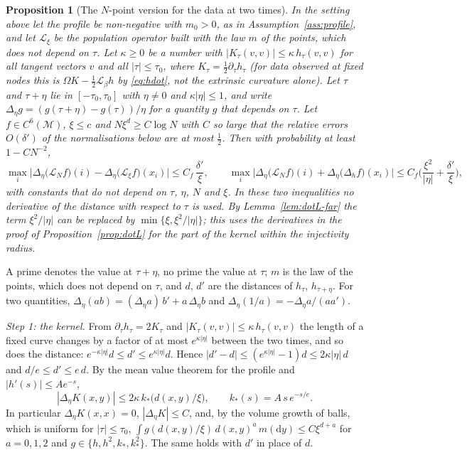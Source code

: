 \documentclass[11pt,a4paper]{article}
\makeatletter
\theoremstyle{stmt}
\newtheorem{proposition}[theorem]{Proposition}
\theoremstyle{defn}
\theoremstyle{rmk}
\renewenvironment{proof}[1][\proofname]{\par\pushQED{\qed}\normalfont\topsep6\p@\@plus6\p@\relax
  \trivlist\item[\hskip\labelsep{\sffamily\itshape\small #1.}]\ignorespaces}{\popQED\endtrivlist\@endpefalse}
\numberwithin{equation}{section}
\newcommand{\Lie}{\mathcal{L}}
\newcommand{\M}{\mathcal{M}}
\newcommand{\Lc}{\mathcal{L}}
\newcommand{\dd}{\mathrm{d}}
\makeatother
\begin{document}
{\begin{proposition}[The $N$-point version for the data at two times]\label{prop:dotLN-diff}
In the setting above let the profile be non-negative with $m_0>0$, as in Assumption~\ref{ass:profile}, and let $\mathcal L_\xi$ be the population operator built with the law $m$ of the points, which does not depend on $\tau$. Let $\kappa\ge0$ be a number with $|K_\tau(v,v)|\le\kappa\,h_\tau(v,v)$ for all tangent vectors $v$ and all $|\tau|\le\tau_0$, where $K_\tau=\frac12\partial_\tau h_\tau$ (for data observed at fixed nodes this is $\Omega K-\frac12\Lie_\beta h$ by \eqref{eq:hdot}, not the extrinsic curvature alone). Let $\tau$ and $\tau+\eta$ lie in $[-\tau_0,\tau_0]$ with $\eta\ne0$ and $\kappa|\eta|\le1$, and write $\Delta_\eta g=(g(\tau+\eta)-g(\tau))/\eta$ for a quantity $g$ that depends on $\tau$. Let $f\in C^6(\M)$, $\xi\le c$ and $N\xi^d\ge C\log N$ with $C$ so large that the relative errors $O(\delta')$ of the normalisations below are at most $\frac12$. Then with probability at least $1-CN^{-2}$,
\[
\max_i\Big|\Delta_\eta\big(\Lc_Nf\big)(i)-\Delta_\eta\big(\Lc_\xi f\big)(x_i)\Big|\le C_f\,\frac{\delta'}{\xi},\qquad
\max_i\Big|\Delta_\eta\big(\Lc_Nf\big)(i)+\Delta_\eta\big(\Delta_hf\big)(x_i)\Big|\le C_f\Big(\frac{\xi^2}{|\eta|}+\frac{\delta'}{\xi}\Big),
\]
with constants that do not depend on $\tau$, $\eta$, $N$ and $\xi$. In these two inequalities no derivative of the distance with respect to $\tau$ is used. By Lemma~\ref{lem:dotL-far} the term $\xi^2/|\eta|$ can be replaced by $\min\{\xi,\xi^2/|\eta|\}$; this uses the derivatives in the proof of Proposition~\ref{prop:dotL} for the part of the kernel within the injectivity radius.
\end{proposition}

\begin{proof}
A prime denotes the value at $\tau+\eta$, no prime the value at $\tau$; $m$ is the law of the points, which does not depend on $\tau$, and $d$, $d'$ are the distances of $h_\tau$, $h_{\tau+\eta}$. For two quantities, $\Delta_\eta(ab)=(\Delta_\eta a)\,b'+a\,\Delta_\eta b$ and $\Delta_\eta(1/a)=-\Delta_\eta a/(aa')$.

\emph{Step 1: the kernel.} From $\partial_\tau h_\tau=2K_\tau$ and $|K_\tau(v,v)|\le\kappa\,h_\tau(v,v)$ the length of a fixed curve changes by a factor of at most $e^{\kappa|\eta|}$ between the two times, and so does the distance: $e^{-\kappa|\eta|}d\le d'\le e^{\kappa|\eta|}d$. Hence $|d'-d|\le(e^{\kappa|\eta|}-1)d\le2\kappa|\eta|\,d$ and $d/e\le d'\le e\,d$. By the mean value theorem for the profile and $|h'(s)|\le Ae^{-s}$,
\[
|\Delta_\eta K(x,y)|\le2\kappa\,k_*\big(d(x,y)/\xi\big),\qquad k_*(s)=A\,s\,e^{-s/e}.
\]
In particular $\Delta_\eta K(x,x)=0$, $|\Delta_\eta K|\le C$, and, by the volume growth of balls, which is uniform for $|\tau|\le\tau_0$, $\int g(d(x,y)/\xi)\,d(x,y)^a\,m(\dd y)\le C\xi^{d+a}$ for $a=0,1,2$ and $g\in\{h,h^2,k_*,k_*^2\}$. The same holds with $d'$ in place of $d$.


\end{proof}}
\end{document}

